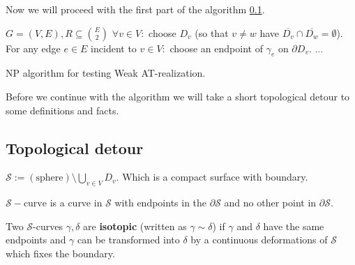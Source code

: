 Now we will proceed with the first part of the algorithm \ref{}.

\begin{algorithm}[!ht]
	\begin{algorithmic}[1]
		\Require $G = (V,E), R \subseteq \binom{E}{2}$
		\State $\forall v \in V:$ choose $D_v$ (so that $v \neq w$ have $\overline{D_v} \cap \overline{D_w} = \emptyset$).
		\State For any edge $e \in E$ incident to $v \in V:$ choose an endpoint of $\gamma_e$ on $\partial D_v$.
		\State \textcolor{Green}{$\dots$}
	\end{algorithmic}
	\caption{NP algorithm for testing Weak AT-realization.}
\end{algorithm}

Before we continue with the algorithm we will take a short topological detour to some definitions and facts.

\subsection{Topological detour}

\begin{defn}
	$\mathcal{S} := (\text{sphere}) \setminus \bigcup_{v \in V} D_v$. Which is a compact surface with boundary.
\end{defn}

\begin{defn}
	$\mathcal{S}-\text{curve}$ is a curve in $\mathcal{S}$ with endpoints in the $\partial \mathcal{S}$ and no other point in $\partial \mathcal{S}$.
\end{defn}

\begin{defn}
	Two $\mathcal{S}$-curves $\gamma, \delta$ are \textbf{isotopic} (written as $\gamma \sim \delta$) if $\gamma$ and $\delta$ have the same endpoints and $\gamma$ can be transformed into $\delta$ by a continuous deformations of $\mathcal{S}$ which fixes the boundary.
\end{defn}

